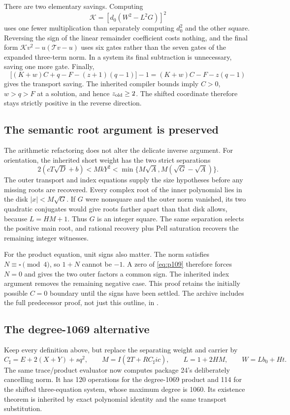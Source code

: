 \documentclass[11pt]{article}
\begin{document}
There are two elementary savings. Computing
\[
 \mathcal K=[d_0(W^2-L^2G)]^2
\]
uses one fewer multiplication than separately computing $d_0^2$ and the
other square. Reversing the sign of the linear remainder coefficient costs
nothing, and the final form $\mathcal Kv^2-u(\mathcal Tv-u)$ uses six gates
rather than the seven gates of the expanded three-term norm. In a system its
final subtraction is unnecessary, saving one more gate. Finally,
\[
 \bigl[(K+w)C+q-F-(z+1)(q-1)\bigr]-1
 =(K+w)C-F-z(q-1)
\]
gives the transport saving. The inherited compiler bounds imply $C>0$,
$w>q>F$ at a solution, and hence $z_{\rm old}\ge2$. The shifted coordinate
therefore stays strictly positive in the reverse direction.

\subsection{The semantic root argument is preserved}

The arithmetic refactoring does not alter the delicate inverse argument.
For orientation, the inherited short weight has the two strict separations
\[
 2(cT\sqrt D+b)<MkY^2
 <\min\{M\sqrt A,M(\sqrt G-\sqrt A)\}.
\]
The outer transport and index equations supply the size hypotheses before
any missing roots are recovered. Every complex root of the inner polynomial
lies in the disk $|x|<M\sqrt G$. If $G$ were nonsquare and the outer norm
vanished, its two quadratic conjugates would give roots farther apart than
that disk allows, because $L=HM+1$. Thus $G$ is an integer square. The same
separation selects the positive main root, and rational recovery plus Pell
saturation recovers the remaining integer witnesses.

For the product equation, unit signs also matter. The norm satisfies
$N\equiv\square\pmod4$, so $1+N$ cannot be $-1$. A zero of
\eqref{eq:p109} therefore forces $N=0$ and gives the two outer factors a
common sign. The inherited index argument removes the remaining negative
case. This proof retains the initially possible $C=0$ boundary until the
signs have been settled. The archive includes the full predecessor proof,
not just this outline, in
.

\subsection{The degree-1069 alternative}

Keep every definition above, but replace the separating weight and carrier by
\[
 C_\sharp=E+2(X+Y)+sq^2,\qquad
 M=I(2T+RC_\sharp ic),\qquad L=1+2HM,\qquad W=Lb_0+Ht.
\]
The same trace/product evaluator now computes package 24's deliberately
cancelling norm. It has 120 operations for the degree-1069 product and 114
for the shifted three-equation system, whose maximum degree is 1060.
Its existence theorem is inherited by exact polynomial identity and the
same transport substitution.
\end{document}
